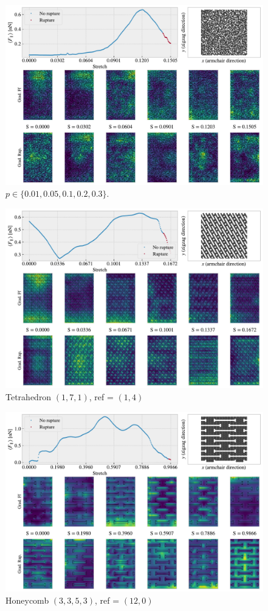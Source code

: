 \begin{figure}[H]
  \centering
  \includegraphics[width=0.8\linewidth]{figures/search/grad_cam_GA_RN_start_top0.pdf}
  \caption{$p \in \{0.01, 0.05, 0.1, 0.2, 0.3\}$.}
  \label{fig:GC_mixed_p}
\end{figure}  

\begin{figure}[H]
  \centering
  \includegraphics[width=0.8\linewidth]{figures/search/grad_cam_pop_1_7_1_1_4.pdf}
  \caption{Tetrahedron $(1,7,1)$, ref = $(1,4)$}
  \label{fig:GC_pop_search}
\end{figure}  


\begin{figure}[H]
  \centering
  \includegraphics[width=0.8\linewidth]{figures/search/grad_cam_hon_3_3_5_3_12_0.pdf}
  \caption{Honeycomb $(3,3,5,3)$, ref = $(12,0)$}
  \label{fig:GC_hon_search}
\end{figure}  

